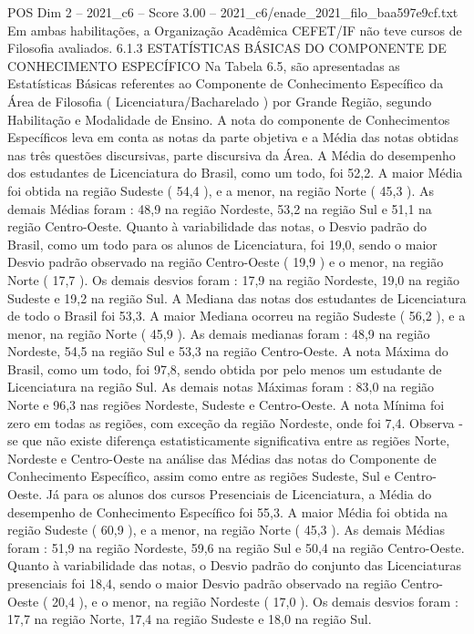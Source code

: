 \begin{textsample}{POS Dim 2 – 2021\_c6 – Score 3.00 – 2021\_c6/enade\_2021\_filo\_baa597e9cf.txt}
Em ambas habilitações, a Organização Acadêmica CEFET/IF não teve cursos de Filosofia avaliados. 6.1.3 ESTATÍSTICAS BÁSICAS DO COMPONENTE DE CONHECIMENTO ESPECÍFICO Na Tabela 6.5, são apresentadas as Estatísticas Básicas referentes ao Componente de Conhecimento Específico da Área de Filosofia ( Licenciatura/Bacharelado ) por Grande Região, segundo Habilitação e Modalidade de Ensino.
A nota do componente de Conhecimentos Específicos leva em conta as notas da parte objetiva e a Média das notas obtidas nas três questões discursivas, parte discursiva da Área.
A Média do desempenho dos estudantes de Licenciatura do Brasil, como um todo, foi 52,2.
A maior Média foi obtida na região Sudeste ( 54,4 ), e a menor, na região Norte ( 45,3 ).
As demais Médias foram : 48,9 na região Nordeste, 53,2 na região Sul e 51,1 na região Centro-Oeste.
Quanto à variabilidade das notas, o Desvio padrão do Brasil, como um todo para os alunos de Licenciatura, foi 19,0, sendo o maior Desvio padrão observado na região Centro-Oeste ( 19,9 ) e o menor, na região Norte ( 17,7 ).
Os demais desvios foram : 17,9 na região Nordeste, 19,0 na região Sudeste e 19,2 na região Sul.
A Mediana das notas dos estudantes de Licenciatura de todo o Brasil foi 53,3.
A maior Mediana ocorreu na região Sudeste ( 56,2 ), e a menor, na região Norte ( 45,9 ).
As demais medianas foram : 48,9 na região Nordeste, 54,5 na região Sul e 53,3 na região Centro-Oeste.
A nota Máxima do Brasil, como um todo, foi 97,8, sendo obtida por pelo menos um estudante de Licenciatura na região Sul.
As demais notas Máximas foram : 83,0 na região Norte e 96,3 nas regiões Nordeste, Sudeste e Centro-Oeste.
A nota Mínima foi zero em todas as regiões, com exceção da região Nordeste, onde foi 7,4.
Observa -se que não existe diferença estatisticamente significativa entre as regiões Norte, Nordeste e Centro-Oeste na análise das Médias das notas do Componente de Conhecimento Específico, assim como entre as regiões Sudeste, Sul e Centro-Oeste.
Já para os alunos dos cursos Presenciais de Licenciatura, a Média do desempenho de Conhecimento Específico foi 55,3.
A maior Média foi obtida na região Sudeste ( 60,9 ), e a menor, na região Norte ( 45,3 ).
As demais Médias foram : 51,9 na região Nordeste, 59,6 na região Sul e 50,4 na região Centro-Oeste.
Quanto à variabilidade das notas, o Desvio padrão do conjunto das Licenciaturas presenciais foi 18,4, sendo o maior Desvio padrão observado na região Centro-Oeste ( 20,4 ), e o menor, na região Nordeste ( 17,0 ).
Os demais desvios foram : 17,7 na região Norte, 17,4 na região Sudeste e 18,0 na região Sul.

\end{textsample}
